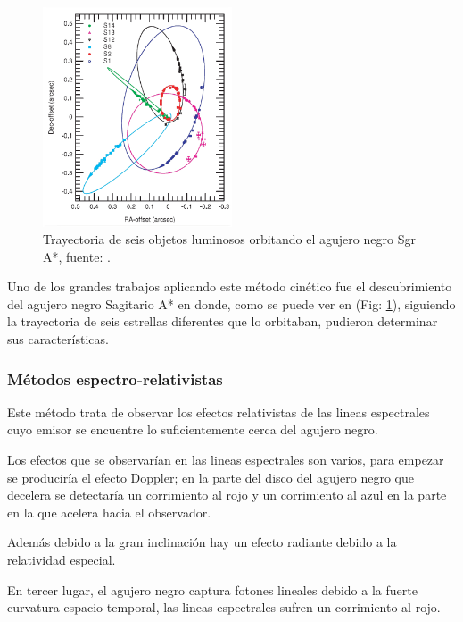 \documentclass{article}
\begin{document}
\begin{figure}[H]
    \centering
    \includegraphics[width=0.5\textwidth]{SixStarsOrbits_Genzel.png}
    \caption{Trayectoria de seis objetos luminosos orbitando el agujero negro Sgr A*, fuente: \cite{genzel2005sinfoni}.}
    \label{fig:SixStarsOrbits_Genzel}
\end{figure}

Uno de los grandes trabajos aplicando este método cinético fue el descubrimiento del agujero negro Sagitario A* en donde, como se puede ver en (Fig: \ref{fig:SixStarsOrbits_Genzel}), siguiendo la trayectoria de seis estrellas diferentes que lo orbitaban, pudieron determinar sus características.\cite{muller2007experimental}

\subsubsection{Métodos espectro-relativistas}
Este método trata de observar los efectos relativistas de las lineas espectrales cuyo emisor se encuentre lo suficientemente cerca del agujero negro.\cite{muller2007experimental}

Los efectos que se observarían en las lineas espectrales son varios, para empezar se produciría el efecto Doppler; en la parte del disco del agujero negro que decelera se detectaría un corrimiento al rojo y un corrimiento al azul en la parte en la que acelera hacia el observador.\cite{muller2007experimental}

Además debido a la gran inclinación hay un efecto radiante debido a la relatividad especial.\cite{muller2007experimental}

En tercer lugar, el agujero negro captura fotones lineales debido a la fuerte curvatura espacio-temporal, las lineas espectrales sufren un corrimiento al rojo.\cite{muller2007experimental}
\end{document}
